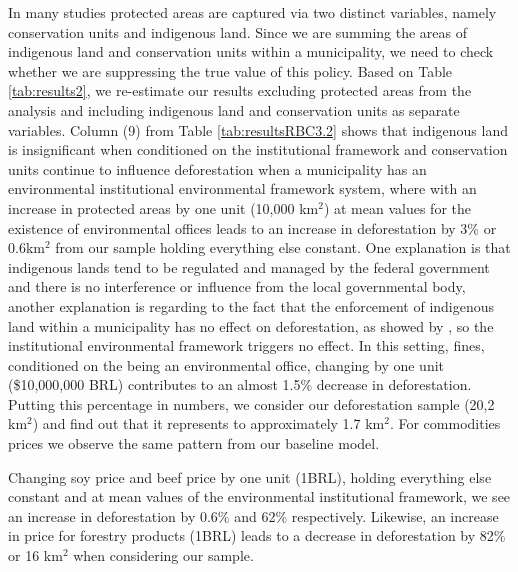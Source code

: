 In many studies protected areas are captured via two distinct variables, namely conservation units and indigenous land. Since we are summing the areas of indigenous land and conservation units within a municipality, we need to check whether we are suppressing the true value of this policy. Based on Table \ref{tab:results2}, we re-estimate our results excluding protected areas from the analysis and including indigenous land and conservation units as separate variables. Column (9) from Table \ref{tab:resultsRBC3.2} shows that indigenous land is insignificant when conditioned on the institutional framework and conservation units continue to influence deforestation when a municipality has an environmental institutional environmental framework system, where with an increase in protected areas by one unit (10,000 km$^{2}$) at mean values for the existence of environmental offices leads to an increase in deforestation by 3\% or 0.6km$^{2}$ from our sample holding everything else constant. One explanation is that indigenous lands tend to be regulated and managed by the federal government and there is no interference or influence from the local governmental body, another explanation is regarding to the fact that the enforcement of indigenous land within a municipality has no effect on deforestation, as showed by \citet{BENYISHAY2017}, so the institutional environmental framework triggers no effect. In this setting, fines, conditioned on the being an environmental office, changing by one unit (\$10,000,000 BRL) contributes to an almost 1.5\% decrease in deforestation. Putting this percentage in numbers, we consider our deforestation sample (20,2 km$^{2}$) and find out that it represents to approximately 1.7 km$^{2}$. For commodities prices we observe the same pattern from our baseline model. 

Changing soy price and beef price by one unit (1BRL), holding everything else constant and at mean values of the environmental institutional framework, we see an increase in deforestation by 0.6\% and 62\% respectively. Likewise, an increase in price for forestry products (1BRL) leads to a decrease in deforestation by 82\% or 16 km$^{2}$ when considering our sample.

